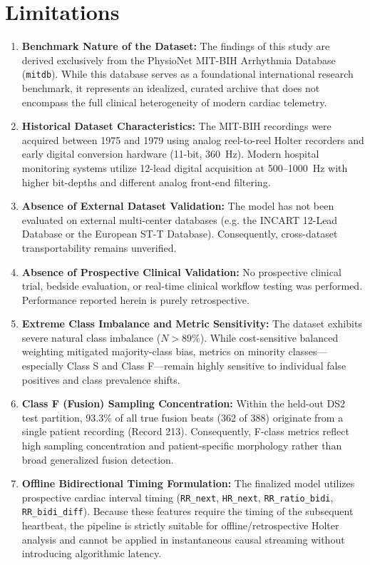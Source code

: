 \documentclass[conference]{IEEEtran}
\begin{document}
\section{Limitations}
\begin{enumerate}
    \item \textbf{Benchmark Nature of the Dataset:} The findings of this study are derived exclusively from the PhysioNet MIT-BIH Arrhythmia Database (\texttt{mitdb}). While this database serves as a foundational international research benchmark, it represents an idealized, curated archive that does not encompass the full clinical heterogeneity of modern cardiac telemetry.
    \item \textbf{Historical Dataset Characteristics:} The MIT-BIH recordings were acquired between 1975 and 1979 using analog reel-to-reel Holter recorders and early digital conversion hardware (11-bit, 360~Hz). Modern hospital monitoring systems utilize 12-lead digital acquisition at 500--1000~Hz with higher bit-depths and different analog front-end filtering.
    \item \textbf{Absence of External Dataset Validation:} The model has not been evaluated on external multi-center databases (e.g. the INCART 12-Lead Database or the European ST-T Database). Consequently, cross-dataset transportability remains unverified.
    \item \textbf{Absence of Prospective Clinical Validation:} No prospective clinical trial, bedside evaluation, or real-time clinical workflow testing was performed. Performance reported herein is purely retrospective.
    \item \textbf{Extreme Class Imbalance and Metric Sensitivity:} The dataset exhibits severe natural class imbalance ($N > 89\%$). While cost-sensitive balanced weighting mitigated majority-class bias, metrics on minority classes---especially Class S and Class F---remain highly sensitive to individual false positives and class prevalence shifts.
    \item \textbf{Class F (Fusion) Sampling Concentration:} Within the held-out DS2 test partition, 93.3\% of all true fusion beats (362 of 388) originate from a single patient recording (Record 213). Consequently, F-class metrics reflect high sampling concentration and patient-specific morphology rather than broad generalized fusion detection.
    \item \textbf{Offline Bidirectional Timing Formulation:} The finalized model utilizes prospective cardiac interval timing (\texttt{RR\_next}, \texttt{HR\_next}, \texttt{RR\_ratio\_bidi}, \texttt{RR\_bidi\_diff}). Because these features require the timing of the subsequent heartbeat, the pipeline is strictly suitable for offline/retrospective Holter analysis and cannot be applied in instantaneous causal streaming without introducing algorithmic latency.

\end{enumerate}
\end{document}
